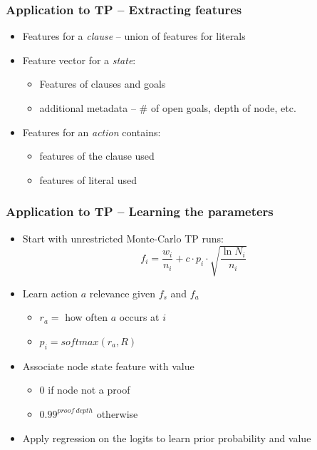 \documentclass{beamer}
\begin{document}
\begin{frame}
    \frametitle{Application to TP -- Extracting features}
    \begin{itemize}
        \item Features for a \emph{clause} -- union of features for literals
        \pause
        \item Feature vector for a \emph{state}:
            \begin{itemize}
                \item Features of clauses and goals
                \item additional metadata -- \# of open goals, depth of node, etc.
            \end{itemize}
        \pause
        \item Features for an \emph{action} contains:
            \begin{itemize}
                \item features of the clause used
                \item features of literal used
            \end{itemize}
    \end{itemize}
\end{frame}

\begin{frame}
    \frametitle{Application to TP -- Learning the parameters}
    \begin{itemize}
        \item Start with unrestricted Monte-Carlo TP runs:
        \begin{equation*}
            f_i=\frac{w_i}{n_i}+c\cdot p_i \cdot \sqrt{\frac{\ln N_i}{n_i}}
        \end{equation*}
        \item<2-> Learn action $a$ relevance given $f_s$ and $f_a$
            \begin{itemize}
                \item $r_a=$ how often $a$ occurs at $i$
                \item $p_i=softmax(r_a, R)$ 
            \end{itemize}
        \item<3-> Associate node state feature with value
            \begin{itemize}
                \item 0 if node not a proof
                \item $0.99^{proof\ depth}$ otherwise
            \end{itemize}
        \item<3-> Apply regression on the logits to learn prior probability and value
    \end{itemize}
\end{frame}
\end{document}
